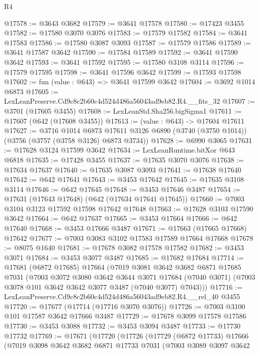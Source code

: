 \begin{lexlean}{R4}
\begin{coremodule}
@17578 := @3643 @3682
@17579 := @3641 @17578
@17580 := @17423 @3455
@17582 := @17580 @3070 @3076
@17583 := @17579 @17582
@17584 := @3641 @17583
@17586 := @17580 @3087 @3093
@17587 := @17579 @17586
@17589 := @3641 @17587 @3642
@17590 := @17584 @17589
@17592 := @3641 @17590 @3642
@17593 := @3641 @17592
@17595 := @17580 @3108 @3114
@17596 := @17579 @17595
@17598 := @3641 @17596 @3642
@17599 := @17593 @17598
@17602 := fun (value : @643) => @3641 @17599 @3642
@17604 := @3692 @1014 @6873
@17605 := LexLeanPreserve.Cd9c8c2b60c4d524d486a56043ad9eb82.R4.__fits_32
@17607 := @3701 (@17605 @3455)
@17608 := LexLeanStd.Sha256.bigSigma1
@17611 := @17607 (@642 (@17608 @3455))
@17613 := (value : @643) -> @17604 @17611
@17627 := @3716
    @1014
    @6873
    @17611
    @3126
    @6890
    (@3740 (@3750 @1014))
    (@3756 (@3757 (@3758 @3126) @6873 @3734))
@17628 := @6990 @3065
@17631 := @17628 @3124 @17599 @3642
@17634 := LexLeanRuntime.bitXor @643 @6818
@17635 := @17428 @3455
@17637 := @17635 @3070 @3076
@17638 := @17634 @17637
@17640 := @17635 @3087 @3093
@17641 := @17638 @17640
@17642 := @642 @17641
@17643 := @3453 @17642
@17645 := @17635 @3108 @3114
@17646 := @642 @17645
@17648 := @3453 @17646 @3487
@17654 := @17631 (@17643 @17648) (@642 (@17634 @17641 @17645))
@17660 := @7003 @3104 @3123 @17592 @17598 @17642 @17648
@17663 := @17628 @3103 @17590 @3642
@17664 := @642 @17637
@17665 := @3453 @17664
@17666 := @642 @17640
@17668 := @3453 @17666 @3487
@17671 := @17663 (@17665 @17668) @17642
@17677 := @7003 @3083 @3102 @17583 @17589 @17664 @17668
@17678 := @8075 @1640
@17681 := @17678 @3082 @17578 @17582
@17682 := @3453 @3071
@17684 := @3453 @3077 @3487
@17685 := @17682 @17684
@17714 := @17681
    (@6872 @17685)
    @17664
    (@7019
      @3081
      @3642
      @3682
      @6871
      @17685
      @7031
      (@7003
        @3072
        @3080
        @3642
        @3644
        @3071
        @17684
        (@7040 @3071)
        (@7003 @3078 @101 @3642 @3642 @3077 @3487 (@7040 @3077) @7043)))
@17716 := LexLeanPreserve.Cd9c8c2b60c4d524d486a56043ad9eb82.R4.__rel_40 @3455
@17720 := @17677 (@17714 (@17716 @3070 @3076))
@17726 := @7003 @3100 @101 @17587 @3642 @17666 @3487
@17729 := @17678 @3099 @17578 @17586
@17730 := @3453 @3088
@17732 := @3453 @3094 @3487
@17733 := @17730 @17732
@17769 := @17671
    (@17720
      (@17726
        (@17729
          (@6872 @17733)
          @17666
          (@7019
            @3098
            @3642
            @3682
            @6871
            @17733
            @7031
            (@7003
              @3089
              @3097
              @3642

\end{coremodule}
\end{lexlean}
